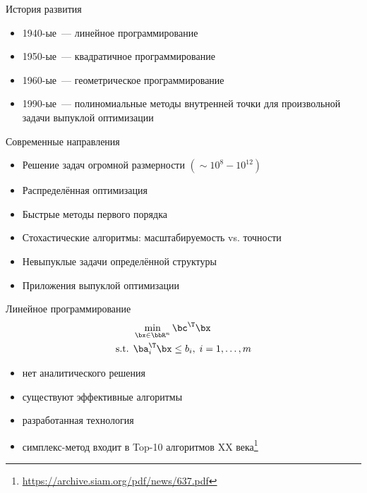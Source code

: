 \documentclass[12pt]{beamer}
\begin{document}
\begin{frame}{История развития}

\begin{itemize}
\item 1940-ые~--- линейное программирование
\item 1950-ые~--- квадратичное программирование
\item 1960-ые~--- геометрическое программирование
\item 1990-ые~--- полиномиальные методы внутренней точки для произвольной задачи выпуклой оптимизации
\end{itemize}
\end{frame}

\begin{frame}{Современные направления}
\begin{itemize}[<+->]
\item Решение задач огромной размерности $(\sim 10^8-10^{12})$
\item Распределённая оптимизация
\item Быстрые методы первого порядка
\item Стохастические алгоритмы: масштабируемость vs. точности
\item Невыпуклые задачи определённой структуры
\item Приложения выпуклой оптимизации
\end{itemize}
\end{frame}

\begin{frame}{Линейное программирование}
\begin{equation*}
\begin{split}
&\min\limits_{\bx \in \bbR^n} \bc^{\T}\bx\\
\text{s.t. } & \ba^{\T}_i \bx \leq b_i, \; i = 1,\ldots, m
\end{split}
\label{eq::lin_prog}
\end{equation*}
\begin{itemize}
\item нет аналитического решения
\item существуют эффективные алгоритмы
\item разработанная технология
\item симплекс-метод входит в Top-10 алгоритмов XX века\footnote{\url{https://archive.siam.org/pdf/news/637.pdf}}
\end{itemize}
\end{frame}
\end{document}
